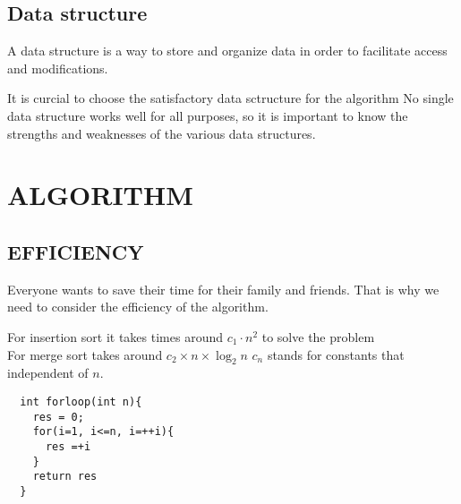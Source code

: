 \documentclass{article}
\theoremstyle{mytheoremstyle}
\theoremstyle{mytheoremstyle}
\theoremstyle{myproblemstyle}
\theoremstyle{myproblemstyle}
\begin{document}
\subsection{Data structure}
\begin{definition}
  A data structure is a way to store and organize data in order to facilitate access and modifications.
\end{definition}
It is curcial to choose the satisfactory data sctructure for the algorithm
No single data structure works well for all purposes, so it is important to know the strengths and weaknesses of the various data structures.


\section{ALGORITHM}
\subsection{EFFICIENCY}
Everyone wants to save their time for their family and friends.
That is why we need to consider the efficiency of the algorithm.
\begin{example}
 For insertion sort it takes times around $c_1\cdot n^2$ to solve the problem \\
 For merge sort takes around $c_2\times n \times \log_{2}n$
$c_n$ stands for constants that independent of $n$.
\end{example}

\begin{lstlisting}
  int forloop(int n){
    res = 0;
    for(i=1, i<=n, i=++i){
      res =+i
    }
    return res
  }
  
\end{lstlisting}
\end{document}
